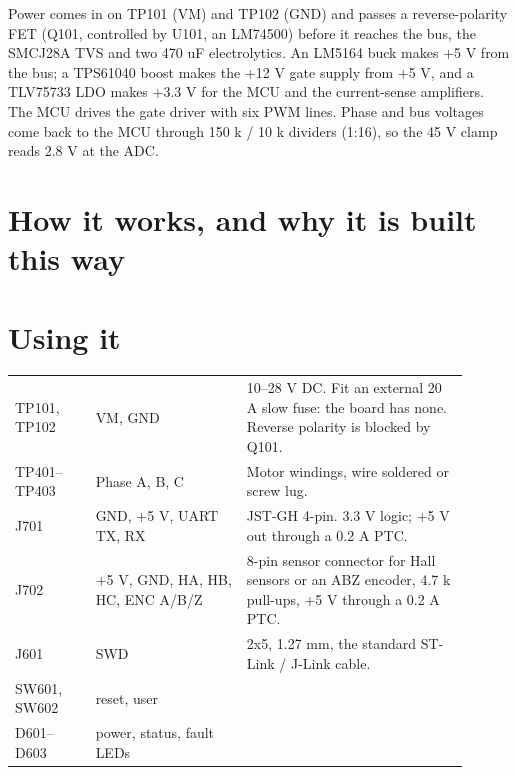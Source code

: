 Power comes in on TP101 (VM) and TP102 (GND) and passes a reverse-polarity FET
(Q101, controlled by U101, an LM74500) before it reaches the bus, the SMCJ28A
TVS and two 470 uF electrolytics. An LM5164 buck makes +5 V from the bus; a
TPS61040 boost makes the +12 V gate supply from +5 V, and a TLV75733 LDO makes
+3.3 V for the MCU and the current-sense amplifiers. The MCU drives the gate
driver with six PWM lines. Phase and bus voltages come back to the MCU through
150 k / 10 k dividers (1:16), so the 45 V clamp reads 2.8 V at the ADC.

\section{How it works, and why it is built this way}



\section{Using it}
\label{sec:using}

\begin{hsblock}
\par\vspace{8pt}
{\small
\begin{tabular}{L{0.16\linewidth} L{0.30\linewidth} L{0.44\linewidth}}
\hstoprule
{} &  &  \\
\hline
TP101, TP102 & VM, GND & 10--28 V DC. Fit an external 20 A slow fuse: the board has none. Reverse polarity is blocked by Q101. \\
TP401--TP403 & Phase A, B, C & Motor windings, wire soldered or screw lug. \\
J701 & GND, +5 V, UART TX, RX & JST-GH 4-pin. 3.3 V logic; +5 V out through a 0.2 A PTC. \\
J702 & +5 V, GND, HA, HB, HC, ENC A/B/Z & 8-pin sensor connector for Hall sensors or an ABZ encoder, 4.7 k pull-ups, +5 V through a 0.2 A PTC. \\
J601 & SWD & 2x5, 1.27 mm, the standard ST-Link / J-Link cable. \\
SW601, SW602 & reset, user & \\
D601--D603 & power, status, fault LEDs & \\
\hline
\end{tabular}}
\end{hsblock}


